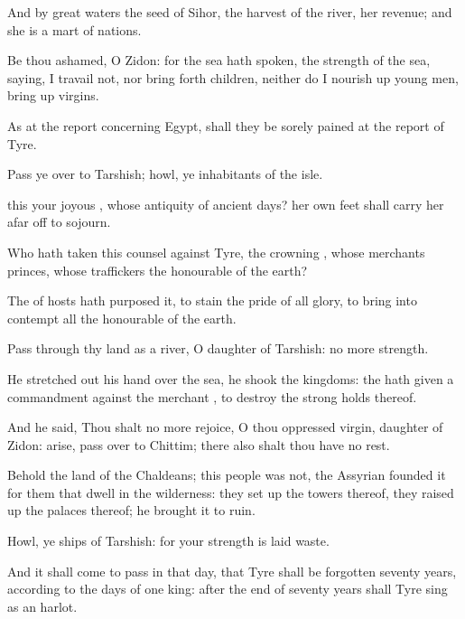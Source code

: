{And by
great
waters the
seed of
Sihor, the
harvest of the
river,
{} her
revenue; and she is a
mart of
nations.

Be thou
ashamed, O
Zidon: for the
sea hath
spoken,
{} the
strength of the
sea,
saying, I
travail not, nor bring forth
children, neither do I nourish
up young
men,
{} bring
up
virgins.

As at the
report concerning
Egypt,
{} shall they be sorely
pained at the
report of
Tyre.

Pass ye
over to
Tarshish;
howl, ye
inhabitants of the
isle.

 this your
joyous
{}, whose
antiquity
{} of
ancient
days? her own
feet shall
carry her afar
off to
sojourn.

Who hath taken this
counsel against
Tyre, the
crowning
{}, whose
merchants
{}
princes, whose
traffickers
{} the
honourable of the
earth?

The
{} of
hosts hath
purposed it, to
stain the
pride of all
glory,
{} to bring into
contempt all the
honourable of the
earth.

Pass through thy
land as a
river, O
daughter of
Tarshish:
{} no more
strength.

He stretched
out his
hand over the
sea, he
shook the
kingdoms: the
{} hath given a
commandment against the
merchant
{}, to
destroy the
strong
holds thereof.

And he
said, Thou shalt no
more
rejoice, O thou
oppressed
virgin,
daughter of
Zidon:
arise, pass
over to
Chittim; there also shalt thou have no
rest.

Behold the
land of the
Chaldeans; this
people was not,
{} the
Assyrian
founded it for them that dwell in the
wilderness: they set
up the
towers thereof, they raised
up the
palaces thereof;
{} he
brought it to
ruin.

Howl, ye
ships of
Tarshish: for your
strength is laid
waste.


\par }{\PP {}And it shall come to pass in that
day, that
Tyre shall be
forgotten
seventy
years, according to the
days of
one
king: after the
end of
seventy
years shall
Tyre
sing as an
harlot.

}
